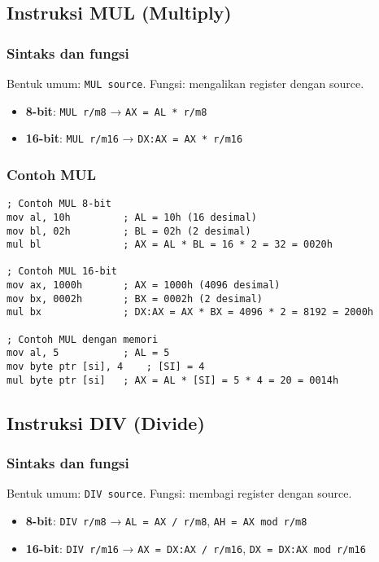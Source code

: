 \documentclass[../main.tex]{subfiles}
\begin{document}
        \subsection{Instruksi MUL (Multiply)}
            \subsubsection{Sintaks dan fungsi}
Bentuk umum: \texttt{MUL source}. Fungsi: mengalikan register dengan source.
\begin{itemize}
    \item \textbf{8-bit}: \texttt{MUL r/m8} → \texttt{AX = AL * r/m8}
    \item \textbf{16-bit}: \texttt{MUL r/m16} → \texttt{DX:AX = AX * r/m16}
\end{itemize}

            \subsubsection{Contoh MUL}
\begin{lstlisting}[language={[x86masm]Assembler}, caption=Instruksi MUL, label={lst:mul-examples}]
; Contoh MUL 8-bit
mov al, 10h         ; AL = 10h (16 desimal)
mov bl, 02h         ; BL = 02h (2 desimal)
mul bl              ; AX = AL * BL = 16 * 2 = 32 = 0020h

; Contoh MUL 16-bit
mov ax, 1000h       ; AX = 1000h (4096 desimal)
mov bx, 0002h       ; BX = 0002h (2 desimal)
mul bx              ; DX:AX = AX * BX = 4096 * 2 = 8192 = 2000h

; Contoh MUL dengan memori
mov al, 5           ; AL = 5
mov byte ptr [si], 4    ; [SI] = 4
mul byte ptr [si]   ; AX = AL * [SI] = 5 * 4 = 20 = 0014h
\end{lstlisting}

        \subsection{Instruksi DIV (Divide)}
            \subsubsection{Sintaks dan fungsi}
Bentuk umum: \texttt{DIV source}. Fungsi: membagi register dengan source.
\begin{itemize}
    \item \textbf{8-bit}: \texttt{DIV r/m8} → \texttt{AL = AX / r/m8}, \texttt{AH = AX mod r/m8}
    \item \textbf{16-bit}: \texttt{DIV r/m16} → \texttt{AX = DX:AX / r/m16}, \texttt{DX = DX:AX mod r/m16}
\end{itemize}
\end{document}
